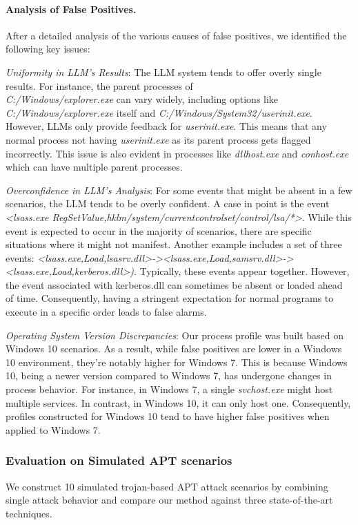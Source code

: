 \smallskip
\paragraph{Analysis of False Positives.}
After a detailed analysis of the various causes of false positives, we identified the following key issues:

\textit{Uniformity in LLM's Results}: The LLM system tends to offer overly single results. For instance, the parent processes of \\ \textit{C:/Windows/explorer.exe} can vary widely, including options like \textit{C:/Windows/explorer.exe} itself and \textit{C:/Windows/System32/userinit.exe}. However, LLMs only provide feedback for \textit{userinit.exe}. This means that any normal process not having \textit{userinit.exe} as its parent process gets flagged incorrectly. This issue is also evident in processes like \textit{dllhost.exe} and \textit{conhost.exe} which can have multiple parent processes.

\textit{Overconfidence in LLM's Analysis}: For some events that might be absent in a few scenarios, the LLM tends to be overly confident. A case in point is the event \\ \textit{<lsass.exe RegSetValue,hklm/system/currentcontrolset/control/lsa/*>}. 
While this event is expected to occur in the majority of scenarios, there are specific situations where it might not manifest.  Another example includes a set of three events:  \textit{<lsass.exe,Load,lsasrv.dll>-><lsass.exe,Load,samsrv.dll>-><lsass.exe,Load,kerberos.dll>)}. Typically, these events appear together. However, the event associated with kerberos.dll can sometimes be absent or loaded ahead of time. Consequently, having a stringent expectation for normal programs to execute in a specific order leads to false alarms.

\textit{Operating System Version Discrepancies}: Our process profile was built based on Windows 10 scenarios. As a result, while false positives are lower in a Windows 10 environment, they're notably higher for Windows 7. This is because Windows 10, being a newer version compared to Windows 7, has undergone changes in process behavior. For instance, in Windows 7, a single \textit{svchost.exe} might host multiple services. In contrast, in Windows 10, it can only host one. Consequently, profiles constructed for Windows 10 tend to have higher false positives when applied to Windows 7.



\subsubsection{Evaluation on Simulated APT scenarios}
We construct 10 simulated trojan-based APT attack scenarios by combining single attack behavior and compare our method against three state-of-the-art techniques. 

